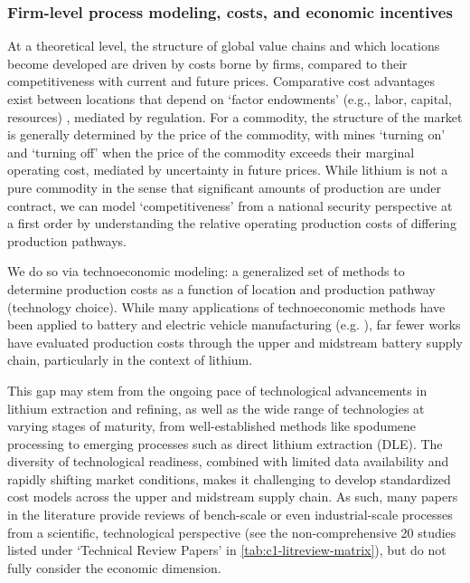 \onehalfspacing

\subsubsection{Firm-level process modeling, costs, and economic incentives}\label{app:04-litreview-incentives}

At a theoretical level, the structure of global value chains and which locations become developed are driven by costs borne by firms, compared to their competitiveness with current and future prices. Comparative cost advantages exist between locations that depend on `factor endowments' (e.g., labor, capital, resources) \cite{ricardoForeignTrade1817, leamerHeckscherOhlinModelTheory1995}, mediated by regulation. For a commodity, the structure of the market is generally determined by the price of the commodity, with mines `turning on' and `turning off' when the price of the commodity exceeds their marginal operating cost, mediated by uncertainty in future prices. While lithium is not a pure commodity in the sense that significant amounts of production are under contract, we can model `competitiveness' from a national security perspective at a first order by understanding the relative operating production costs of differing production pathways.

We do so via technoeconomic modeling: a generalized set of methods to determine production costs as a function of location and production pathway (technology choice). While many applications of technoeconomic methods have been applied to battery and electric vehicle manufacturing (e.g. \cite{duffnerBatteryCostModeling2020, saktiTechnoeconomicAnalysisOptimization2015, orangiTechnoEconomicModelBenchmarking2022}), far fewer works have evaluated production costs through the upper and midstream battery supply chain, particularly in the context of lithium.

This gap may stem from the ongoing pace of technological advancements in lithium extraction and refining, as well as the wide range of technologies at varying stages of maturity, from well-established methods like spodumene processing to emerging processes such as direct lithium extraction (DLE). The diversity of technological readiness, combined with limited data availability and rapidly shifting market conditions, makes it challenging to develop standardized cost models across the upper and midstream supply chain. As such, many papers in the literature provide reviews of bench-scale or even industrial-scale processes from a scientific, technological perspective (see the non-comprehensive 20 studies listed under `Technical Review Papers' in \ref{tab:c1-litreview-matrix}), but do not fully consider the economic dimension.

